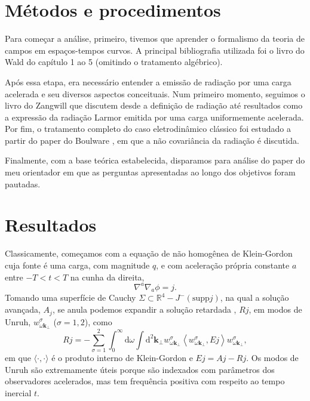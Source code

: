 \documentclass[10pt]{article}
\begin{document}
\begin{multicols*}{2}
    \section*{Métodos e procedimentos}
    Para começar a análise, primeiro, tivemos que aprender o formalismo da teoria de campos em espaços-tempos curvos. A principal bibliografia utilizada foi o livro do Wald \cite{waldqft} do capítulo 1 ao 5 (omitindo o tratamento algébrico).

    Após essa etapa, era necessário entender a emissão de radiação por uma carga acelerada e seu diversos aspectos conceituais. Num primeiro momento, seguimos o livro do Zangwill \cite{zang} que discutem desde a definição de radiação até resultados como a expressão da radiação Larmor emitida por uma carga uniformemente acelerada. Por fim, o tratamento completo do caso eletrodinâmico clássico foi estudado a partir do paper do Boulware \cite{boulware}, em que a não covariância da radiação é discutida.

    Finalmente, com a base teórica estabelecida, disparamos para análise do paper do meu orientador \cite{landulfo} em que as perguntas apresentadas ao longo dos objetivos foram pautadas.

    
    \section*{Resultados}
    Classicamente, começamos com a equação de não homogênea de Klein-Gordon cuja fonte é uma carga, com magnitude \(q\), e com aceleração própria constante \(a\) entre \(-T<t<T\) na cunha da direita,
    \begin{equation}
        \nabla^a\nabla_a\phi=j.
        \label{eq:kg}
    \end{equation}
    Tomando uma superfície de Cauchy \(\Sigma\subset\mathbb{R}^4-J^-(\textrm{supp}j)\), na qual a solução avançada, \(A_j\), se anula podemos expandir a solução retardada , \(Rj\), em modos de Unruh, \(w^{\sigma}_{\omega\mathbf{k}_{\perp}}\) (\(\sigma=1,2\)), como
    \begin{equation}
        Rj=-\sum_{\sigma=1}^2\int_0^{\infty}\mathrm{d}\omega\int\mathrm{d}^2\mathbf{k}_\perp w^{\sigma}_{\omega\mathbf{k}_{\perp}}\left\langle w^{\sigma}_{\omega\mathbf{k}_{\perp}},Ej\right\rangle w^{\sigma}_{\omega\mathbf{k}_{\perp}},
    \end{equation}
    em que \(\langle\cdot,\cdot\rangle\) é o produto interno de Klein-Gordon e \(Ej=Aj-Rj\). Os modos de Unruh são extremamente úteis porque são indexados com parâmetros dos observadores acelerados, mas tem frequência positiva com respeito ao tempo inercial \(t\).


\end{multicols*}
\end{document}
